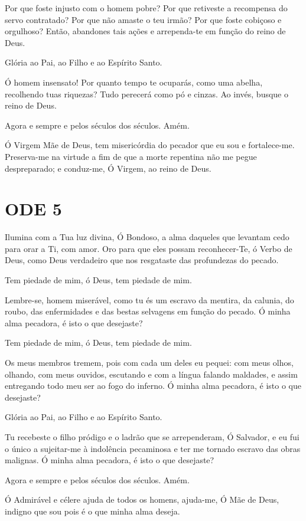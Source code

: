 \documentclass{subfiles}
\begin{document}
Por que foste injusto com o homem pobre? Por que retiveste a recompensa do servo
contratado? Por que não amaste o teu irmão? Por que foste cobiçoso e orgulhoso?
Então, abandones tais ações e arrependa-te em função do reino de Deus.

Glória ao Pai, ao Filho e ao Espírito Santo.

Ó homem insensato! Por quanto tempo te ocuparás, como uma abelha, recolhendo
tuas riquezas? Tudo perecerá como pó e cinzas. Ao invés, busque o reino de Deus.

Agora e sempre e pelos séculos dos séculos. Amém.

\theotokion{}Ó Virgem Mãe de Deus, tem misericórdia do pecador que eu sou
e fortalece-me. Preserva-me na virtude a fim de que a morte repentina não
me pegue despreparado; e conduz-me, Ó Virgem, ao reino de Deus.

\section*{ODE 5}

\eirmos{}Ilumina com a Tua luz divina, Ó Bondoso, a alma daqueles que levantam
cedo para orar a Ti, com amor. Oro para que eles possam reconhecer-Te, ó
Verbo de Deus, como Deus verdadeiro que nos resgataste das profundezas do
pecado.

Tem piedade de mim, ó Deus, tem piedade de mim.

Lembre-se, homem miserável, como tu és um escravo da mentira, da
calunia, do roubo, das enfermidades e das bestas selvagens em função do
pecado. Ó minha alma pecadora, é isto o que desejaste?

Tem piedade de mim, ó Deus, tem piedade de mim.

Os meus membros tremem, pois com cada um deles eu pequei: com
meus olhos, olhando, com meus ouvidos, escutando e com a língua falando
maldades, e assim entregando todo meu ser ao fogo do inferno. Ó minha alma
pecadora, é isto o que desejaste?

Glória ao Pai, ao Filho e ao Espírito Santo.

Tu recebeste o filho pródigo e o ladrão que se arrependeram, Ó
Salvador, e eu fui o único a sujeitar-me à indolência pecaminosa e ter me
tornado escravo das obras malignas. Ó minha alma pecadora, é isto o que
desejaste?

Agora e sempre e pelos séculos dos séculos. Amém.

Ó Admirável e célere ajuda de todos os homens, ajuda-me, Ó Mãe de
Deus, indigno que sou pois é o que minha alma deseja.
\end{document}
